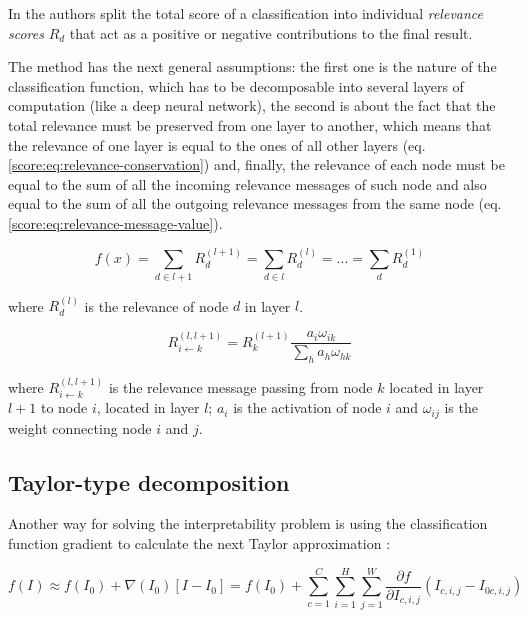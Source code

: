 In \citep{bach2015pixel} the authors split the total score of a classification into individual \emph{relevance scores} $R_d$ that act as a positive or negative contributions to the final result. 

The method has the next general assumptions: the first one is the nature of the classification function, which has to be decomposable into several layers of computation (like a deep neural network), the second is about the fact that the total relevance must be preserved from one layer to another, which means that the relevance of one layer is equal to the ones of all other layers (eq. \ref{score:eq:relevance-conservation}) and, finally, the relevance of each node must be equal to the sum of all the incoming relevance messages of such node and also equal to the sum of all the outgoing relevance messages from the same node (eq. \ref{score:eq:relevance-message-value}).

\begin{equation}
f(x) = \sum_{d \in l+1}R_d^{(l+1)} = \sum_{d \in l}R_d^{(l)} = ... = \sum_{d}R_d^{(1)}
\label{score:eq:relevance-conservation}
\end{equation}

where $R_d^{(l)}$ is the relevance of node $d$ in layer $l$.

\begin{equation}
R_{i \leftarrow k}^{(l,l+1)} = R_k^{(l+1)} \frac{a_i \omega_{ik}}{\sum_{h} a_h \omega_{hk}}
\label{score:eq:relevance-message-value}
\end{equation}

where $R_{i \leftarrow k}^{(l,l+1)}$ is the relevance message passing from node $k$ located in layer $l+1$ to node $i$, located in layer $l$; $a_i$ is the activation of node $i$ and $\omega_{ij}$ is the weight connecting node $i$ and $j$.

\subsection{Taylor-type decomposition} 

Another way for solving the interpretability problem is using the classification function gradient to calculate the next Taylor approximation \citep{bach2015pixel}:

\begin{equation}
f(I) \approx f(I_0) + \nabla(I_0) [ I - I_0] = f(I_0) + \sum_{c=1}^C \sum_{i=1}^{H} \sum_{j=1}^W \frac{\partial f}{\partial I_{c,i,j}}(I_{c,i,j} - I_{0 c, i, j}) 
\label{score:eq:taylor}
\end{equation}

